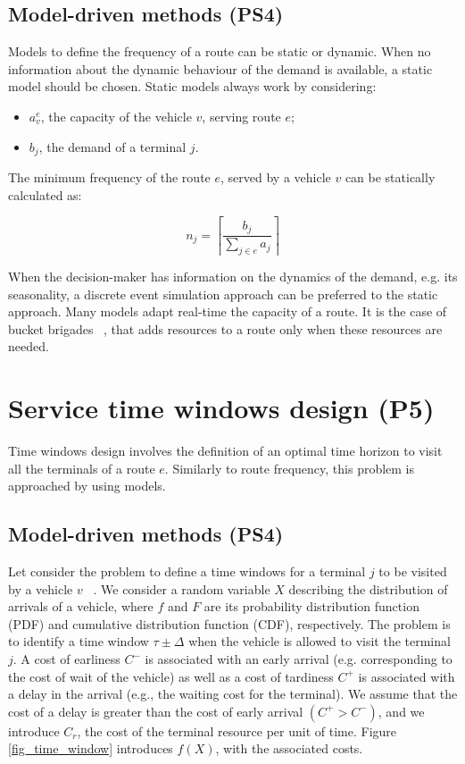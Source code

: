 \subsection{Model-driven methods (PS4)}
Models to define the frequency of a route can be static or dynamic. When no information about the dynamic behaviour of the demand is available, a static model should be chosen. Static models always work by considering:

\begin{itemize}
    \item $a_v^{e}$, the capacity of the vehicle $v$, serving route $e$;
    \item $b_j$, the demand of a terminal $j$.
\end{itemize}
The minimum frequency of the route $e$, served by a vehicle $v$ can be statically calculated as:

\begin{equation}
    n_j=\left\lceil\frac{b_j}{\sum_{j\in e} a_j}\right\rceil
\end{equation}

When the decision-maker has information on the dynamics of the demand, e.g. its seasonality, a discrete event simulation approach can be preferred to the static approach. Many models adapt real-time the capacity of a route. It is the case of bucket brigades ~\cite{Bartholdi2006}, that adds resources to a route only when these resources are needed.

\section{Service time windows design (P5)}
Time windows design involves the definition of an optimal time horizon to visit all the terminals of a route $e$. Similarly to route frequency, this problem is approached by using models.

\subsection{Model-driven methods (PS4)}
Let consider the problem to define a time windows for a terminal $j$ to be visited by a vehicle $v$ ~\cite{Zuidwijk2017}. We consider a random variable $X$ describing the distribution of arrivals of a vehicle, where $f$ and $F$ are its probability distribution function (PDF) and cumulative distribution function (CDF), respectively. The problem is to identify a time window $\tau\pm\Delta$  when the vehicle is allowed to visit the terminal $j$. A cost of earliness $C^{-}$ is associated with an early arrival (e.g. corresponding to the cost of wait of the vehicle) as well as a cost of tardiness $C^{+}$ is associated with a delay in the arrival (e.g., the waiting cost for the terminal). We assume that the cost of a delay is greater than the cost of early arrival $(C^+>C^-)$, and we introduce $C_r$,  the cost of the terminal resource per unit of time. Figure \ref{fig_time_window} introduces $f(X)$, with the associated costs.

